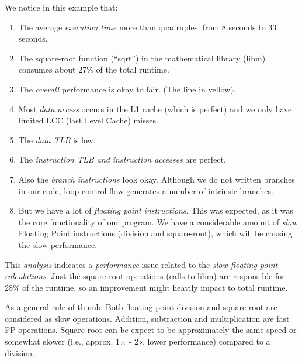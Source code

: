 We notice in this example that:
\begin{enumerate}
  \item  The average \emph{execution time} more than quadruples, from 8 seconds to 33 seconds.
  \item  The square-root function (``sqrt'') in the mathematical library (libm) consumes about 27\% of the total runtime.
  \item  The \emph{overall} performance is okay to fair. (The line in yellow).
  \item  Most \emph{data access} occurs in the L1 cache (which is perfect) and we only have limited LCC (last Level Cache) misses.
  \item  The \emph{data TLB} is low.
  \item  The \emph{instruction TLB and instruction accesses} are perfect.
  \item  Also the \emph{branch instructions} look okay. Although we do not written branches in our code, loop control flow generates a number of intrinsic branches.
  \item  But we have a lot of \emph{floating point instructions}. This was expected, as it was the core functionality of our program. We have a considerable amount of \emph{slow} Floating Point instructions (division and square-root), which will be causing the slow performance.
\end{enumerate}

This \emph{analysis} indicates a \emph{performance} issue related to the \emph{slow floating-point calculations}. Just the square root operations (calls to libm) are responsible for 28\% of the runtime, so an improvement might heavily impact to total runtime.

As a general rule of thumb: Both floating-point division and square root are considered as slow operations. Addition, subtraction and multiplication are fast FP operations. Square root can be expect to be approximately the same speed or somewhat slower (i.e., approx. 1$\times$ - 2$\times$ lower performance) compared to a division.

